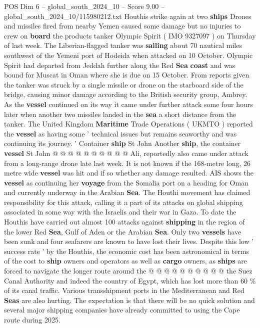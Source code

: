 \begin{textsample}{POS Dim 6 – global\_south\_2024\_10 – Score 9.00 – global\_south\_2024\_10/115980212.txt}  \label{ex:f6_pos_411}
Houthis strike again at two \textbf{ships} Drones and missiles fired from nearby Yemen caused some damage but no injuries to crew on \textbf{board} the products tanker Olympic Spirit ( IMO 9327097 ) on Thursday of last week.
The Liberian-flagged tanker was \textbf{sailing} about 70 nautical miles southwest of the Yemeni port of Hodeida when attacked on 10 October.
Olympic Spirit had departed from Jeddah further along the Red \textbf{Sea} \textbf{coast} and was bound for Muscat in Oman where she is due on 15 October.
From reports given the tanker was struck by a single missile or drone on the starboard side of the bridge, causing minor damage according to the British security group, Ambrey.
As the \textbf{vessel} continued on its way it came under further attack some four hours later when another two missiles landed in the \textbf{sea} a short distance from the tanker.
The United Kingdom \textbf{Maritime} Trade Operations ( UKMTO ) reported the \textbf{vessel} as having some ' technical issues but remains seaworthy and was continuing its journey. ' Container \textbf{ship} St John Another \textbf{ship}, the container \textbf{vessel} St John @ @ @ @ @ @ @ @ @ @ Ali, reportedly also came under attack from a long-range drone late last week.
It is not known if the 168-metre long, 26 metre wide \textbf{vessel} was hit and if so whether any damage resulted.
AIS shows the \textbf{vessel} as continuing her \textbf{voyage} from the Somalia port on a heading for Oman and currently underway in the Arabian \textbf{Sea}.
The Houthi movement has claimed responsibility for this attack, calling it a part of its attacks on global shipping associated in some way with the Israelis and their war in Gaza.
To date the Houthis have carried out almost 100 attacks against \textbf{shipping} in the region of the lower Red \textbf{Sea}, Gulf of Aden or the Arabian \textbf{Sea}.
Only two \textbf{vessels} have been sunk and four seafarers are known to have lost their lives.
Despite this low ' success rate ' by the Houthis, the economic cost has been astronomical in terms of the cost to \textbf{ship} owners and operators as well as \textbf{cargo} owners, as \textbf{ships} are forced to navigate the longer route around the @ @ @ @ @ @ @ @ @ @ the Suez Canal Authority and indeed the country of Egypt, which has lost more than 60 \% of its canal traffic.
Various transshipment ports in the Mediterranean and Red \textbf{Seas} are also hurting.
The expectation is that there will be no quick solution and several major shipping companies have already committed to using the Cape route during 2025.

\end{textsample}
